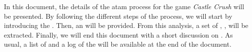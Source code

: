 In this document, the details of the \gls{atam} process for the game \textit{Castle Crush} will be presented. By following the different steps of the process, we will start by introducing the . Then, an  will be provided. From this analysis, a set of , ,  will be extracted. Finally, we will end this document with a short discussion on . As usual, a list of  and a log of the  will be available at the end of the document.
